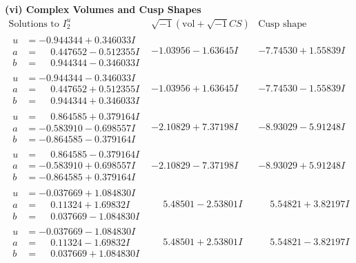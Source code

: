 \documentclass[1p]{elsarticle_modified}
\theoremstyle{definition}
\newcommand{\I}{\sqrt{-1}}
\begin{document}
\newpage\flushleft \textbf{(vi) Complex Volumes and Cusp Shapes}
$$\begin{array}{c|c|c}  
\text{Solutions to }I^u_{2}& \I (\text{vol} + \sqrt{-1}CS) & \text{Cusp shape}\\
 \hline 
\begin{aligned}
u &= -0.944344 + 0.346033 I \\
a &= \phantom{-}0.447652 - 0.512355 I \\
b &= \phantom{-}0.944344 - 0.346033 I\end{aligned}
 & -1.03956 - 1.63645 I & -7.74530 + 1.55839 I \\ \hline\begin{aligned}
u &= -0.944344 - 0.346033 I \\
a &= \phantom{-}0.447652 + 0.512355 I \\
b &= \phantom{-}0.944344 + 0.346033 I\end{aligned}
 & -1.03956 + 1.63645 I & -7.74530 - 1.55839 I \\ \hline\begin{aligned}
u &= \phantom{-}0.864585 + 0.379164 I \\
a &= -0.583910 - 0.698557 I \\
b &= -0.864585 - 0.379164 I\end{aligned}
 & -2.10829 + 7.37198 I & -8.93029 - 5.91248 I \\ \hline\begin{aligned}
u &= \phantom{-}0.864585 - 0.379164 I \\
a &= -0.583910 + 0.698557 I \\
b &= -0.864585 + 0.379164 I\end{aligned}
 & -2.10829 - 7.37198 I & -8.93029 + 5.91248 I \\ \hline\begin{aligned}
u &= -0.037669 + 1.084830 I \\
a &= \phantom{-}0.11324 + 1.69832 I \\
b &= \phantom{-}0.037669 - 1.084830 I\end{aligned}
 & \phantom{-}5.48501 - 2.53801 I & \phantom{-}5.54821 + 3.82197 I \\ \hline\begin{aligned}
u &= -0.037669 - 1.084830 I \\
a &= \phantom{-}0.11324 - 1.69832 I \\
b &= \phantom{-}0.037669 + 1.084830 I\end{aligned}
 & \phantom{-}5.48501 + 2.53801 I & \phantom{-}5.54821 - 3.82197 I \\ \hline\begin{aligned}

\end{aligned}
\end{array}$$
\end{document}

